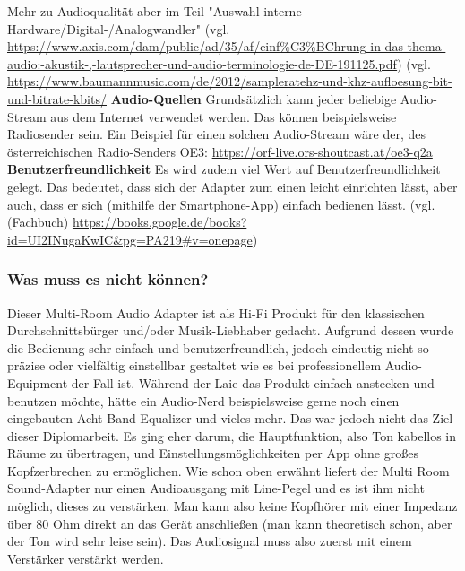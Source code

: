 \documentclass[11pt, twoside]{article}
\begin{document}
Mehr zu Audioqualität aber im Teil "Auswahl interne Hardware/Digital-/Analogwandler"
\vspace{4mm} \newline
(vgl. \url{https://www.axis.com/dam/public/ad/35/af/einf%C3%BChrung-in-das-thema-audio:-akustik-,-lautsprecher-und-audio-terminologie-de-DE-191125.pdf}) 
\newline
(vgl. \url{https://www.baumannmusic.com/de/2012/sampleratehz-und-khz-aufloesung-bit-und-bitrate-kbits/}
\vspace{4mm}\newline
\textbf{Audio-Quellen}\newline
Grundsätzlich kann jeder beliebige Audio-Stream aus dem Internet verwendet werden. Das können beispielsweise Radiosender sein.
Ein Beispiel für einen solchen Audio-Stream wäre der, des österreichischen Radio-Senders \glqq OE3\grqq{}: \newline
\url{https://orf-live.ors-shoutcast.at/oe3-q2a}
\vspace{4mm}\newline
\textbf{Benutzerfreundlichkeit}\newline
Es wird zudem viel Wert auf Benutzerfreundlichkeit gelegt. Das bedeutet, dass sich der Adapter zum einen leicht einrichten lässt, aber auch, dass er sich (mithilfe der Smartphone-App) einfach bedienen lässt.
\vspace{4mm} \newline
(vgl. (Fachbuch) \url{https://books.google.de/books?id=UI2INugaKwIC&pg=PA219#v=onepage})
\subsubsection{Was muss es nicht können?}
Dieser Multi-Room Audio Adapter ist als Hi-Fi Produkt für den klassischen Durchschnittsbürger und/oder Musik-Liebhaber gedacht. Aufgrund dessen wurde die Bedienung sehr einfach und benutzerfreundlich, jedoch eindeutig nicht so präzise oder vielfältig einstellbar gestaltet wie es bei professionellem Audio-Equipment der Fall ist. Während der Laie das Produkt einfach anstecken und benutzen möchte, hätte ein Audio-Nerd beispielsweise gerne noch einen eingebauten Acht-Band Equalizer und vieles mehr. Das war jedoch nicht das Ziel dieser Diplomarbeit. Es ging eher darum, die Hauptfunktion, also Ton kabellos in Räume zu übertragen, und Einstellungsmöglichkeiten per App ohne großes Kopfzerbrechen zu ermöglichen.\newline
Wie schon oben erwähnt liefert der Multi Room Sound-Adapter nur einen Audioausgang mit Line-Pegel und es ist ihm nicht möglich, dieses zu verstärken. Man kann also keine Kopfhörer mit einer Impedanz über 80 Ohm direkt an das Gerät anschließen (man kann theoretisch schon, aber der Ton wird sehr leise sein). Das Audiosignal muss also zuerst mit einem Verstärker verstärkt werden.\newline
\end{document}
